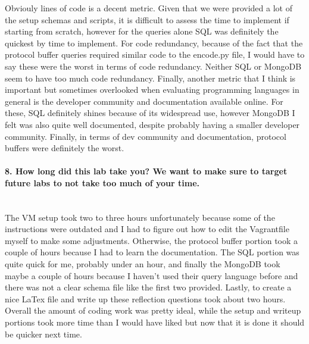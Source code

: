 \documentclass[12pt]{article}
\begin{document}
Obviouly lines of code is a decent metric. Given that we were provided a lot of the setup schemas and scripts, it is difficult to assess the time to implement if starting from scratch, however for the queries alone SQL was definitely the quickest by time to implement. For code redundancy, because of the fact that the protocol buffer queries required similar code to the encode.py file, I would have to say these were the worst in terms of code redundancy. Neither SQL or MongoDB seem to have too much code redundancy.  Finally, another metric that I think is important but sometimes overlooked when evaluating programming languages in general is the developer community and documentation available online. For these, SQL definitely shines because of its widespread use, however MongoDB I felt was also quite well documented, despite probably having a smaller developer community. Finally, in terms of dev community and documentation, protocol buffers were definitely the worst.

\paragraph{8. How long did this lab take you? We want to make sure to target future labs to not take too much of your time.}\mbox{}\\

The VM setup took two to three hours unfortunately because some of the instructions were outdated and I had to figure out how to edit the Vagrantfile myself to make some adjustments. Otherwise, the protocol buffer portion took a couple of hours because I had to learn the documentation.  The SQL portion was quite quick for me, probably under an hour, and finally the MongoDB took maybe a couple of hours because I haven't used their query language before and there was not a clear schema file like the first two provided. Lastly, to create a nice LaTex file and write up these reflection questions took about two hours. Overall the amount of coding work was pretty ideal, while the setup and writeup portions took more time than I would have liked but now that it is done it should be quicker next time.
\end{document}
